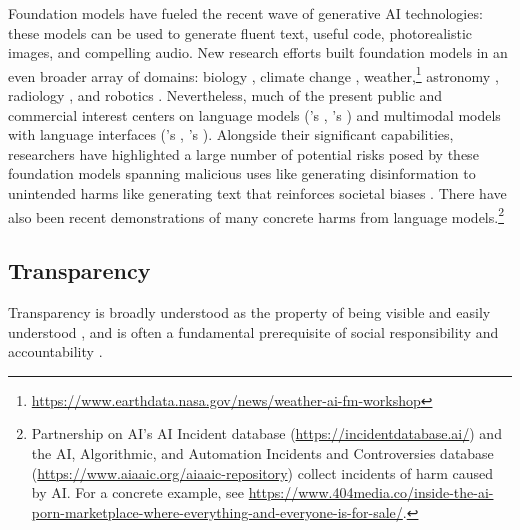 Foundation models have fueled the recent wave of generative AI technologies: these models can be used to generate fluent text, useful code, photorealistic images, and compelling audio.
New research efforts built foundation models in an even broader array of domains: biology \citep{lin2023evolutionary}, climate change \citep{lacoste2023geobench}, weather,\footnote{\url{https://www.earthdata.nasa.gov/news/weather-ai-fm-workshop}} astronomy \citep{nguyen2023astrollama}, radiology \citep{chambon2022roentgen}, and robotics \citep{openx2023openx}.
Nevertheless, much of the present public and commercial interest centers on language models (\eg \anthropic's \claude, \meta's \llama) and multimodal models with language interfaces (\eg \stability's \stablediffusion, \openai's \gptfour). 
Alongside their significant capabilities, researchers have highlighted a large number of potential risks posed by these foundation models spanning malicious uses like generating disinformation to unintended harms like generating text that reinforces societal biases \citep{bender2021dangers, bommasani2021opportunities, abid2021persistent, weidinger2022taxonomy}.
There have also been recent demonstrations of many concrete harms from language models.\footnote{Partnership on AI's AI Incident database (\url{https://incidentdatabase.ai/}) and the AI, Algorithmic, and Automation Incidents and Controversies database (\url{https://www.aiaaic.org/aiaaic-repository}) collect incidents of harm caused by AI. For a concrete example, see \url{https://www.404media.co/inside-the-ai-porn-marketplace-where-everything-and-everyone-is-for-sale/}.} 

\hypertarget{transparency}{\subsection{Transparency}}
\label{sec:background-transparency}
Transparency is broadly understood as the property of being visible and easily understood \citep{aristotle350deanima, kalderon2015transparency}, and is often a fundamental prerequisite of social responsibility and accountability \citep{florini2007right,robinson2012nations}.


